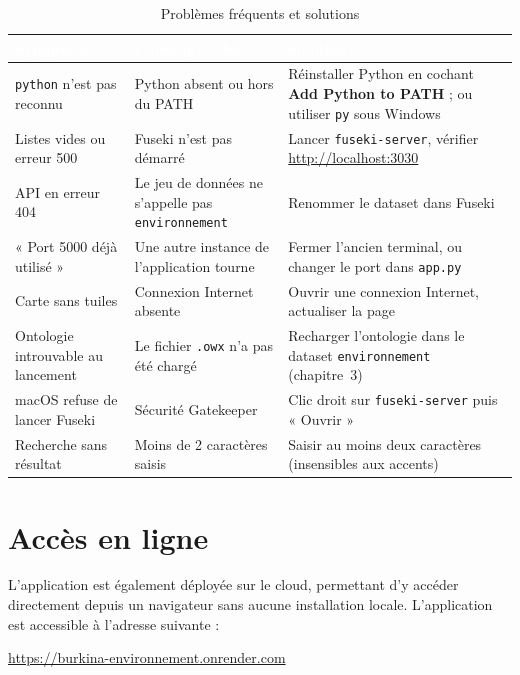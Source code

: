 ﻿\documentclass[12pt,a4paper]{report}
\newcommand{\tete}[1]{\cellcolor{bleu}\textcolor{white}{\bfseries #1}}
\begin{document}
\begin{table}[H]
\centering
\caption{Problèmes fréquents et solutions}
\begin{tabular}{@{}p{4.0cm}p{5.6cm}p{5.0cm}@{}}
\hline
\tete{Symptôme} & \tete{Cause probable} & \tete{Solution} \\
\hline
\rowcolor{grisfond} \texttt{python} n'est pas reconnu & Python absent ou hors du PATH & Réinstaller Python en cochant \textbf{Add Python to PATH} ; ou utiliser \texttt{py} sous Windows \\
\rowcolor{grisfond} Listes vides ou erreur 500 & Fuseki n'est pas démarré & Lancer \texttt{fuseki-server}, vérifier \url{http://localhost:3030} \\
\rowcolor{grisfond} API en erreur 404 & Le jeu de données ne s'appelle pas \texttt{environnement} & Renommer le dataset dans Fuseki \\
\rowcolor{grisfond} « Port 5000 déjà utilisé » & Une autre instance de l'application tourne & Fermer l'ancien terminal, ou changer le port dans \texttt{app.py} \\
\rowcolor{grisfond} Carte sans tuiles & Connexion Internet absente & Ouvrir une connexion Internet, actualiser la page \\
\rowcolor{grisfond} Ontologie introuvable au lancement & Le fichier \texttt{.owx} n'a pas été chargé & Recharger l'ontologie dans le dataset \texttt{environnement} (chapitre~3) \\
\rowcolor{grisfond} macOS refuse de lancer Fuseki & Sécurité Gatekeeper & Clic droit sur \texttt{fuseki-server} puis « Ouvrir » \\
\rowcolor{grisfond} Recherche sans résultat & Moins de 2 caractères saisis & Saisir au moins deux caractères (insensibles aux accents) \\
\hline
\end{tabular}
\end{table}

\section{Accès en ligne}

L'application est également déployée sur le cloud, permettant d'y accéder directement depuis un
navigateur sans aucune installation locale. L'application est accessible à l'adresse suivante :

\begin{center}\large
      \url{https://burkina-environnement.onrender.com}
\end{center}
\end{document}
